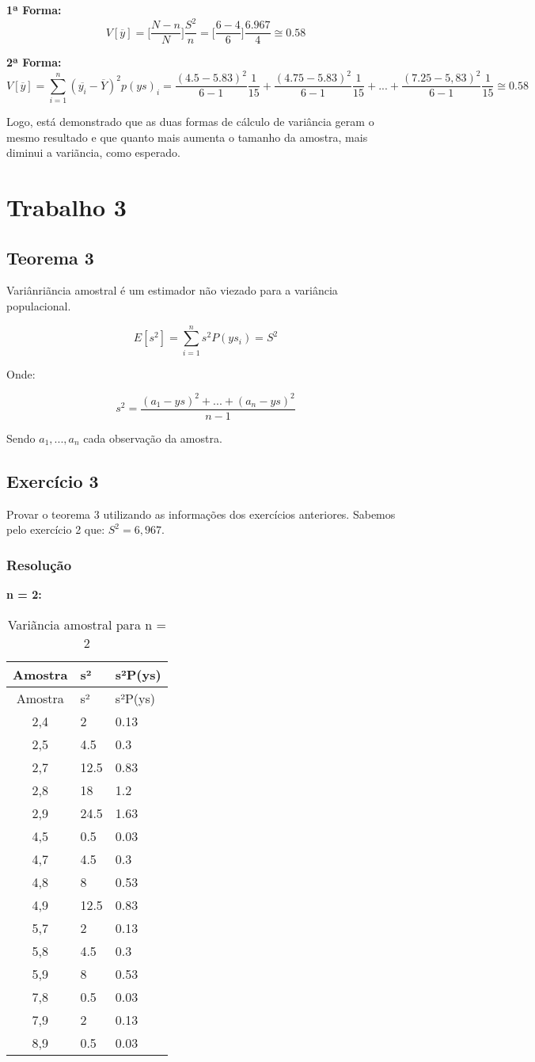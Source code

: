 \documentclass[]{article}
\begin{document}
\textbf{1ª Forma:} \[
V[\overline{y}]=\bigg[\dfrac{N-n}{N}\bigg] \dfrac{S^2}{n}=\bigg[\dfrac{6-4}{6}\bigg]\dfrac{6.967}{4}\cong0.58
\]

\textbf{2ª Forma:} \[
V[\overline{y}]=\sum_{i=1}^n(\overline{y_i}-\overline{Y})^2p(ys)_i=\dfrac{(4.5-5.83)^2}{6-1}\dfrac{1}{15}+\dfrac{(4.75-5.83)^2}{6-1}\dfrac{1}{15}+...+\dfrac{(7.25-5,83)^2}{6-1}\dfrac{1}{15}\cong0.58
\]

Logo, está demonstrado que as duas formas de cálculo de variância geram
o mesmo resultado e que quanto mais aumenta o tamanho da amostra, mais
diminui a variãncia, como esperado.

\section{Trabalho 3}\label{trabalho-3}

\subsection{Teorema 3}\label{teorema-3}

Variânriãncia amostral é um estimador não viezado para a variância
populacional.

\[
E[s^2]=\sum_{i=1}^ns^2P(ys_i)=S^2
\]

Onde:

\[
s^2=\dfrac{(a_1-ys)^2+...+(a_n-ys)^2}{n-1}
\]

Sendo \(a_1, ..., a_n\) cada observação da amostra.

\subsection{Exercício 3}\label{exercicio-3}

Provar o teorema 3 utilizando as informações dos exercícios anteriores.
Sabemos pelo exercício 2 que: \(S^2=6,967\).

\subsubsection{Resolução}\label{resolucao-2}

\textbf{n = 2:}

\begin{longtable}[]{@{}cll@{}}
\caption{Variãncia amostral para n = 2}\tabularnewline
\toprule
Amostra & s² & s²P(ys)\tabularnewline
\midrule
\endfirsthead
\toprule
Amostra & s² & s²P(ys)\tabularnewline
\midrule
\endhead
2,4 & 2 & 0.13\tabularnewline
2,5 & 4.5 & 0.3\tabularnewline
2,7 & 12.5 & 0.83\tabularnewline
2,8 & 18 & 1.2\tabularnewline
2,9 & 24.5 & 1.63\tabularnewline
4,5 & 0.5 & 0.03\tabularnewline
4,7 & 4.5 & 0.3\tabularnewline
4,8 & 8 & 0.53\tabularnewline
4,9 & 12.5 & 0.83\tabularnewline
5,7 & 2 & 0.13\tabularnewline
5,8 & 4.5 & 0.3\tabularnewline
5,9 & 8 & 0.53\tabularnewline
7,8 & 0.5 & 0.03\tabularnewline
7,9 & 2 & 0.13\tabularnewline
8,9 & 0.5 & 0.03\tabularnewline
\bottomrule
\end{longtable}
\end{document}
